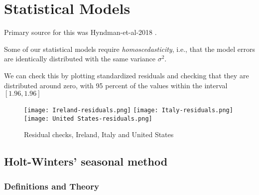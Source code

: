 \section{Statistical Models}
\label{ch:statmodel}

Primary source for this was Hyndman-et-al-2018 \cite{Hyndman-et-al-2018}.

Some of our statistical models require \textit{homoscedasticity}, i.e., that the model errors are identically distributed with the same variance $\sigma^2$.

We can check this by plotting standardized residuals and checking that they are distributed around zero, with 95 percent of the values within the interval $[1.96,1.96]$

\begin{figure}[H]
  \texttt{[image: Ireland-residuals.png]} \label{fig:ireland-residuals}
\endminipage\hfill
{}
  \texttt{[image: Italy-residuals.png]} \label{fig:italy-residuals}
\endminipage\hfill
{}
  \texttt{[image: United States-residuals.png]} \label{fig:usa-residuals}
\endminipage\hfill
\caption{Residual checks, Ireland, Italy and United States}
\end{figure}

\subsection{Holt-Winters’ seasonal method}

\subsubsection{Definitions and Theory}

